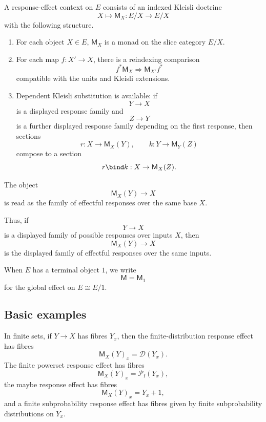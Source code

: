 \begin{definition}
\label{def:response-effect-context}
A response-effect context on \(E\) consists of an indexed Kleisli doctrine
\[
X\longmapsto \mathsf M_X:E/X\to E/X
\]
with the following structure.

\begin{enumerate}
\item For each object \(X\in E\), \(\mathsf M_X\) is a monad on the slice category \(E/X\).

\item For each map \(f:X'\to X\), there is a reindexing comparison
\[
f^\ast\mathsf M_X
\Longrightarrow
\mathsf M_{X'}f^\ast
\]
compatible with the units and Kleisli extensions.

\item Dependent Kleisli substitution is available: if
\[
Y\to X
\]
is a displayed response family and
\[
Z\to Y
\]
is a further displayed response family depending on the first response, then sections
\[
r:X\to \mathsf M_X(Y),
\qquad
k:Y\to \mathsf M_Y(Z)
\]
compose to a section
\[
r\bind k:X\to \mathsf M_X(Z).
\]
\end{enumerate}

The object
\[
\mathsf M_X(Y)\to X
\]
is read as the family of effectful responses over the same base \(X\).
\end{definition}

Thus, if
\[
Y\to X
\]
is a displayed family of possible responses over inputs \(X\), then
\[
\mathsf M_X(Y)\to X
\]
is the displayed family of effectful responses over the same inputs.

When \(E\) has a terminal object \(1\), we write
\[
\mathsf M=\mathsf M_1
\]
for the global effect on \(E\cong E/1\).

\subsection{Basic examples}
\label{subsec:basic-response-effects}

In finite sets, if \(Y\to X\) has fibres \(Y_x\), then the finite-distribution response effect has
fibres
\[
\mathsf M_X(Y)_x
=
\mathcal D(Y_x).
\]
The finite powerset response effect has fibres
\[
\mathsf M_X(Y)_x
=
\mathcal P_{\mathrm f}(Y_x),
\]
the maybe response effect has fibres
\[
\mathsf M_X(Y)_x
=
Y_x+1,
\]
and a finite subprobability response effect has fibres given by finite subprobability distributions
on \(Y_x\).

